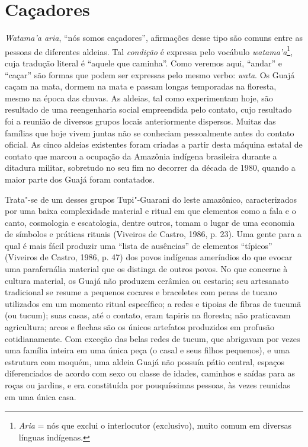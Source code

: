 \section{Caçadores}

\emph{Watama'a aria}, ``nós somos caçadores'', afirmações desse tipo são
comuns entre as pessoas de diferentes aldeias. Tal \emph{condição} é
expressa pelo vocábulo \emph{watama'a}\footnote{\emph{Aria} = nós que
  exclui o interlocutor (exclusivo), muito comum em diversas línguas
  indígenas.}, cuja tradução literal é ``aquele que caminha''. Como
veremos aqui, ``andar'' e ``caçar'' são formas que podem ser expressas pelo
mesmo verbo: \emph{wata}. Os Guajá caçam na mata, dormem na mata e
passam longas temporadas na floresta, mesmo na época das chuvas. As
aldeias, tal como experimentam hoje, são resultado de uma reengenharia
social empreendida pelo contato, cujo resultado foi a reunião de
diversos grupos locais anteriormente dispersos. Muitas das famílias que
hoje vivem juntas não se conheciam pessoalmente antes do contato
oficial. As cinco aldeias existentes foram criadas a partir desta
máquina estatal de contato que marcou a ocupação da Amazônia indígena
brasileira durante a ditadura militar, sobretudo no seu fim no decorrer
da década de 1980, quando a maior parte dos Guajá foram contatados.

Trata"-se de um desses grupos Tupi"-Guarani do leste amazônico,
caracterizados por uma baixa complexidade material e ritual em que
elementos como a fala e o canto, cosmologia e escatologia, dentre
outros, tomam o lugar de uma economia de símbolos e práticas rituais
(Viveiros de Castro, 1986, p. 23). Uma gente para a qual é mais fácil
produzir uma ``lista de ausências'' de elementos ``típicos'' (Viveiros
de Castro, 1986, p. 47) dos povos indígenas ameríndios do que evocar uma
parafernália material que os distinga de outros povos. No que concerne à
cultura material, os Guajá não produzem cerâmica ou cestaria; seu
artesanato tradicional se resume a pequenos cocares e braceletes com
penas de tucano utilizados em um momento ritual específico; a redes e
tipoias de fibras de tucumã (ou tucum); suas casas, até o contato, eram
tapiris na floresta; não praticavam agricultura; arcos e flechas são os
únicos artefatos produzidos em profusão cotidianamente. Com exceção das
belas redes de tucum, que abrigavam por vezes uma família inteira em uma
única peça (o casal e seus filhos pequenos), e uma estrutura com moquém,
uma aldeia Guajá não possuía pátio central, espaços diferenciados de
acordo com sexo ou classe de idades, caminhos e saídas para as roças ou
jardins, e era constituída por pouquíssimas pessoas, às vezes reunidas
em uma única casa.

